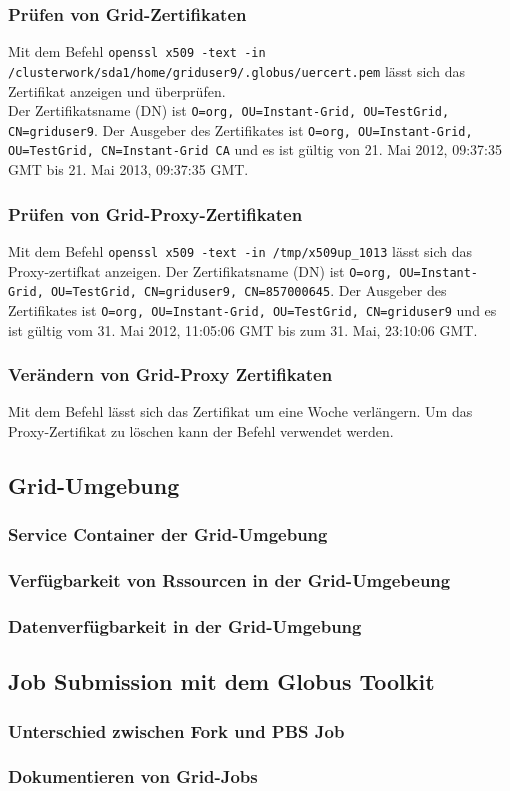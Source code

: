 	\subsubsection{Prüfen von Grid-Zertifikaten}
		Mit dem Befehl 
		\texttt{openssl x509 -text -in /clusterwork/sda1/home/griduser9/.globus/uercert.pem}
		lässt sich das Zertifikat anzeigen und überprüfen.\\
		Der Zertifikatsname (DN) ist \texttt{O=org, OU=Instant-Grid, OU=TestGrid, CN=griduser9}.
		Der Ausgeber des Zertifikates ist \texttt{O=org, OU=Instant-Grid, OU=TestGrid, CN=Instant-Grid CA}
		und es ist gültig von 21. Mai 2012, 09:37:35 GMT bis 21. Mai 2013, 09:37:35 GMT.
		
	\subsubsection{Prüfen von Grid-Proxy-Zertifikaten}
		Mit dem Befehl 
		\texttt{openssl x509 -text -in /tmp/x509up\_1013}
		lässt sich das Proxy-zertifkat anzeigen.
		Der Zertifikatsname (DN) ist \texttt{O=org, OU=Instant-Grid, OU=TestGrid, CN=griduser9, CN=857000645}.
		Der Ausgeber des Zertifikates ist \texttt{O=org, OU=Instant-Grid, OU=TestGrid, CN=griduser9}
		und es ist gültig vom 31. Mai 2012, 11:05:06 GMT bis zum 31. Mai, 23:10:06 GMT.
		
	\subsubsection{Verändern von Grid-Proxy Zertifikaten}
		Mit dem Befehl
		\texttt{}
		lässt sich das Zertifikat um eine Woche verlängern.
		Um das Proxy-Zertifikat zu löschen kann der Befehl
		\texttt{}
		verwendet werden.

\subsection{Grid-Umgebung}
	\subsubsection{Service Container der Grid-Umgebung}
	\subsubsection{Verfügbarkeit von Rssourcen in der Grid-Umgebeung}
	\subsubsection{Datenverfügbarkeit in der Grid-Umgebung}

\subsection{Job Submission mit dem Globus Toolkit}
	\subsubsection{Unterschied zwischen Fork und PBS Job}
	\subsubsection{Dokumentieren von Grid-Jobs}

